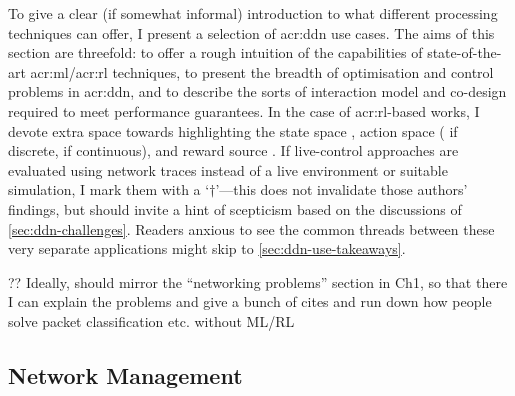 To give a clear (if somewhat informal) introduction to what different processing techniques can offer, I present a selection of \gls{acr:ddn} use cases.
The aims of this section are threefold: to offer a rough intuition of the capabilities of state-of-the-art \gls{acr:ml}/\gls{acr:rl} techniques, to present the breadth of optimisation and control problems in \gls{acr:ddn}, and to describe the sorts of interaction model and co-design required to meet performance guarantees.
In the case of \gls{acr:rl}-based works, I devote extra space towards highlighting the state space \prllitstate{}, action space (\rllitact{} if discrete, \rllitactreal{} if continuous), and reward source \prllitreward.
If live-control approaches are evaluated using network traces instead of a live environment or suitable simulation, I mark them with a `$\dagger$'---this does not invalidate those authors' findings, but should invite a hint of scepticism based on the discussions of \cref{sec:ddn-challenges}.
Readers anxious to see the common threads between these very separate applications might skip to \cref{sec:ddn-use-takeaways}.
%
%
%
%
%
%


?? Ideally, should mirror the ``networking problems'' section in Ch1, so that there I can explain the problems and give a bunch of cites and run down how people solve packet classification etc. without ML/RL

\subsection{Network Management}

